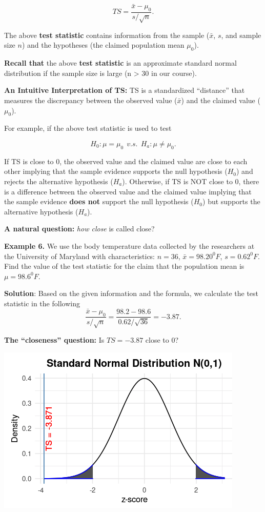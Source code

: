 \documentclass[
]{book}
\begin{document}
\[
TS = \frac{\bar{x} - \mu_0}{s/\sqrt{n}}.
\]

The above \textbf{test statistic} contains information from the sample (\(\bar{x}\), \(s\), and sample size \(n\)) and the hypotheses (the claimed population mean \(\mu_0\)).

\textbf{Recall that} the above \textbf{test statistic} is an approximate standard normal distribution if the sample size is large (n \textgreater{} 30 in our course).

\textbf{An Intuitive Interpretation of TS:} TS is a standardized ``distance'' that measures the discrepancy between the observed value (\(\bar{x}\)) and the claimed value (\(\mu_0\)).

For example, if the above test statistic is used to test

\[ H_0: \mu = \mu_0  \ \ v.s. \ \ H_a: \mu \ne \mu_0.\]

If TS is close to \(0\), the observed value and the claimed value are close to each other implying that the sample evidence supports the null hypothesis (\(H_0\)) and rejects the alternative hypothesis (\(H_a\)). Otherwise, if TS is NOT close to \(0\), there is a difference between the observed value and the claimed value implying that the sample evidence \textbf{does not} support the null hypothesis (\(H_0\)) but supports the alternative hypothesis (\(H_a\)).

\textbf{A natural question:} \emph{how close} is called close?

\hfill\break

\textbf{Example 6. } We use the body temperature data collected by the researchers at the University of Maryland with characteristics: \(n=36\), \(\bar{x} = 98.20^0F\), \(s=0.62^0F\). Find the value of the test statistic for the claim that the population mean is \(\mu = 98.6^0F\).

\textbf{Solution}: Based on the given information and the formula, we calculate the test statistic in the following
\[
\frac{\bar{x} - \mu_0}{s/\sqrt{n}} = \frac{98.2 - 98.6}{0.62/\sqrt{36}} = -3.87.
\]

\textbf{The ``closeness'' question:} Is \(TS = -3.87\) close to \(0\)?

\begin{center}\includegraphics[width=0.45\linewidth]{week08/closenessTS} \end{center}
\end{document}
